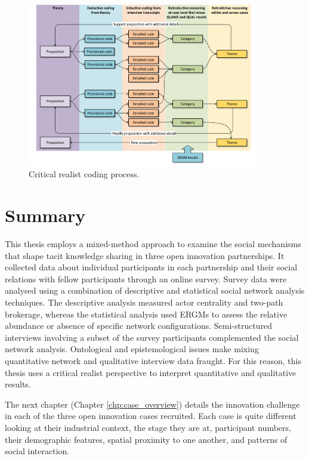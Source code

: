 \begin{figure}
\centering
\includegraphics[width = 0.9\textwidth,
height = 0.7\textheight, keepaspectratio]{Images/CR.pdf}
\caption[Critical realist coding process]{Critical realist coding process.}
\label{fig:coding_process}
\end{figure}

\section{Summary}

This thesis employs a mixed-method approach to examine the social mechanisms that shape tacit knowledge sharing in three open innovation partnerships. It collected data about individual participants in each partnership and their social relations with fellow participants through an online survey. Survey data were analysed using a combination of descriptive and statistical social network analysis techniques. The descriptive analysis measured actor centrality and two-path brokerage, whereas the statistical analysis used ERGMs to assess the relative abundance or absence of specific network configurations. Semi-structured interviews involving a subset of the survey participants complemented the social network analysis. Ontological and epistemological issues make mixing quantitative network and qualitative interview data fraught. For this reason, this thesis uses a critical realist perspective to interpret quantitative and qualitative results. \medskip

The next chapter (Chapter \ref{chp:case_overview}) details the innovation challenge in each of the three open innovation cases recruited. Each case is quite different looking at their industrial context, the stage they are at, participant numbers, their demographic features, spatial proximity to one another, and patterns of social interaction. 